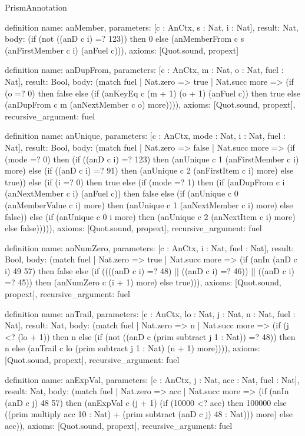 \begin{lexlean}{PrismAnnotation}
\begin{semanticmodule}
definition{
  name: anMember,
  parameters: [c : AnCtx, s : Nat, i : Nat],
  result: Nat,
  body: (if (not ((anD c i) =? 123)) then 0 else (anMemberFrom c s (anFirstMember c i) (anFuel c))),
  axioms: [Quot.sound, propext]
}

definition{
  name: anDupFrom,
  parameters: [c : AnCtx, m : Nat, o : Nat, fuel : Nat],
  result: Bool,
  body: (match fuel
    | Nat.zero => true
    | Nat.succ more => (if (o =? 0) then false else (if (anKeyEq c (m + 1) (o + 1) (anFuel c)) then true else (anDupFrom c m (anNextMember c o) more)))),
  axioms: [Quot.sound, propext],
  recursive_argument: fuel
}

definition{
  name: anUnique,
  parameters: [c : AnCtx, mode : Nat, i : Nat, fuel : Nat],
  result: Bool,
  body: (match fuel
    | Nat.zero => false
    | Nat.succ more => (if (mode =? 0) then (if ((anD c i) =? 123) then (anUnique c 1 (anFirstMember c i) more) else (if ((anD c i) =? 91) then (anUnique c 2 (anFirstItem c i) more) else true)) else (if (i =? 0) then true else (if (mode =? 1) then (if (anDupFrom c i (anNextMember c i) (anFuel c)) then false else (if (anUnique c 0 (anMemberValue c i) more) then (anUnique c 1 (anNextMember c i) more) else false)) else (if (anUnique c 0 i more) then (anUnique c 2 (anNextItem c i) more) else false))))),
  axioms: [Quot.sound, propext],
  recursive_argument: fuel
}

definition{
  name: anNumZero,
  parameters: [c : AnCtx, i : Nat, fuel : Nat],
  result: Bool,
  body: (match fuel
    | Nat.zero => true
    | Nat.succ more => (if (anIn (anD c i) 49 57) then false else (if ((((anD c i) =? 48) || ((anD c i) =? 46)) || ((anD c i) =? 45)) then (anNumZero c (i + 1) more) else true))),
  axioms: [Quot.sound, propext],
  recursive_argument: fuel
}

definition{
  name: anTrail,
  parameters: [c : AnCtx, lo : Nat, j : Nat, n : Nat, fuel : Nat],
  result: Nat,
  body: (match fuel
    | Nat.zero => n
    | Nat.succ more => (if (j <? (lo + 1)) then n else (if (not ((anD c (prim subtract j 1 : Nat)) =? 48)) then n else (anTrail c lo (prim subtract j 1 : Nat) (n + 1) more)))),
  axioms: [Quot.sound, propext],
  recursive_argument: fuel
}

definition{
  name: anExpVal,
  parameters: [c : AnCtx, j : Nat, acc : Nat, fuel : Nat],
  result: Nat,
  body: (match fuel
    | Nat.zero => acc
    | Nat.succ more => (if (anIn (anD c j) 48 57) then (anExpVal c (j + 1) (if (10000 <? acc) then 100000 else ((prim multiply acc 10 : Nat) + (prim subtract (anD c j) 48 : Nat))) more) else acc)),
  axioms: [Quot.sound, propext],
  recursive_argument: fuel
}


\end{semanticmodule}
\end{lexlean}
